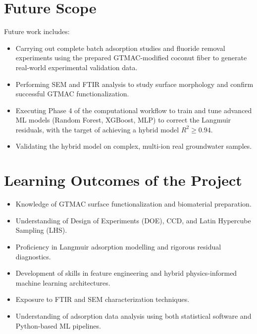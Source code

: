 \section{Future Scope}
Future work includes:
\begin{itemize}
    \item Carrying out complete batch adsorption studies and fluoride removal experiments using the prepared GTMAC-modified coconut fiber to generate real-world experimental validation data.
    \item Performing SEM and FTIR analysis to study surface morphology and confirm successful GTMAC functionalization.
    \item Executing Phase 4 of the computational workflow to train and tune advanced ML models (Random Forest, XGBoost, MLP) to correct the Langmuir residuals, with the target of achieving a hybrid model $R^2 \geq 0.94$.
    \item Validating the hybrid model on complex, multi-ion real groundwater samples.
\end{itemize}

\section{Learning Outcomes of the Project}
\begin{itemize}
\item Knowledge of GTMAC surface functionalization and biomaterial preparation.  
\item Understanding of Design of Experiments (DOE), CCD, and Latin Hypercube Sampling (LHS).  
\item Proficiency in Langmuir adsorption modelling and rigorous residual diagnostics.  
\item Development of skills in feature engineering and hybrid physics-informed machine learning architectures.
\item Exposure to FTIR and SEM characterization techniques.   
\item Understanding of adsorption data analysis using both statistical software and Python-based ML pipelines.
\end{itemize}
